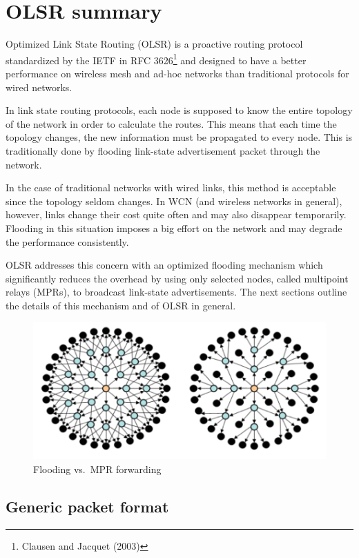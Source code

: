 \documentclass[oneside,openany]{memoir}
\begin{document}
\chapter{OLSR summary}\label{olsr-summary}

Optimized Link State Routing (OLSR) is a proactive routing protocol
standardized by the IETF in RFC 3626\footnote{Clausen and Jacquet (2003)}
and designed to have a better performance on wireless mesh and ad-hoc
networks than traditional protocols for wired networks.

In link state routing protocols, each node is supposed to know the
entire topology of the network in order to calculate the routes. This
means that each time the topology changes, the new information must be
propagated to every node. This is traditionally done by flooding
link-state advertisement packet through the network.

In the case of traditional networks with wired links, this method is
acceptable since the topology seldom changes. In WCN (and wireless
networks in general), however, links change their cost quite often and
may also disappear temporarily. Flooding in this situation imposes a big
effort on the network and may degrade the performance consistently.

OLSR addresses this concern with an optimized flooding mechanism which
significantly reduces the overhead by using only selected nodes, called
multipoint relays (MPRs), to broadcast link-state advertisements. The
next sections outline the details of this mechanism and of OLSR in
general.

\begin{figure}[htbp]
\centering
\includegraphics{images/mpr.png}
\caption{Flooding vs.~MPR forwarding}
\end{figure}

\section{Generic packet format}\label{generic-packet-format}
\end{document}
